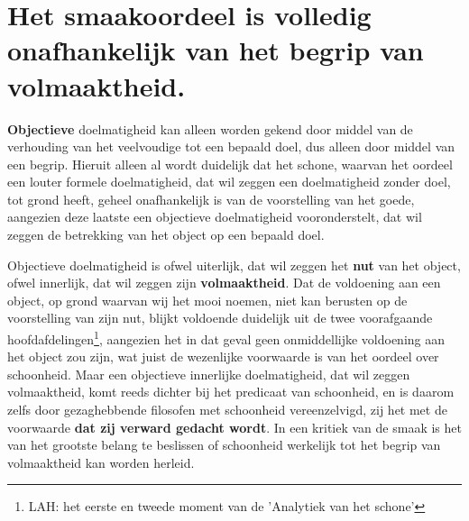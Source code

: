 \section{Het smaakoordeel is volledig onafhankelijk van het begrip van volmaaktheid.}

\textbf{Objectieve} doelmatigheid kan alleen worden gekend door middel van de verhouding van het veelvoudige tot een bepaald doel, dus alleen door middel van een begrip. Hieruit alleen al wordt duidelijk dat het schone, waarvan het oordeel een louter formele doelmatigheid, dat wil zeggen een doelmatigheid zonder doel, tot grond heeft, geheel onafhankelijk is van de voorstelling van het goede, aangezien deze laatste een objectieve doelmatigheid vooronderstelt, dat wil zeggen de betrekking van het object op een bepaald doel.

Objectieve doelmatigheid is ofwel uiterlijk, dat wil zeggen het \textbf{nut} van het object, ofwel innerlijk, dat wil zeggen zijn \textbf{volmaaktheid}. Dat de voldoening aan een object, op grond waarvan wij het mooi noemen, niet kan berusten op de voorstelling van zijn nut, blijkt voldoende duidelijk uit de twee voorafgaande hoofdafdelingen\footnote{LAH: het eerste en tweede moment van de 'Analytiek van het schone'}, aangezien het in dat geval geen onmiddellijke voldoening aan het object zou zijn, wat juist de wezenlijke voorwaarde is van het oordeel over schoonheid. Maar een objectieve innerlijke doelmatigheid, dat wil zeggen volmaaktheid, komt reeds dichter bij het predicaat van schoonheid, en is daarom zelfs door gezaghebbende filosofen met schoonheid vereenzelvigd, zij het met de voorwaarde \textbf{dat zij verward gedacht wordt}. In een kritiek van de smaak is het van het grootste belang te beslissen of schoonheid werkelijk tot het begrip van volmaaktheid kan worden herleid.

